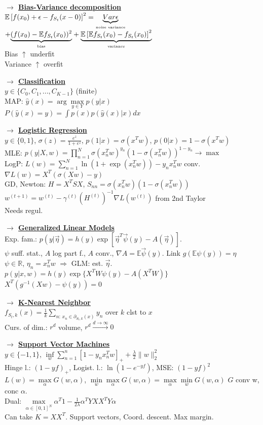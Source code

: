 \documentclass[11pt]{article}
\newcommand{\underlabel}[2]{\underset{\mbox{\tiny #2}}{\underbrace{#1}}}
\newcommand{\mytitle}[1]{ {\bf $\rightarrow$ \underline{#1}}\\}
\begin{document}
\begin{multicols*}{2}
\mytitle{Bias-Variance decomposition}
$\mathbb{E}\left[f(x_0)+\epsilon-f_{S_t}(x-0)\right]^2=\underlabel{Var\epsilon}{noise variance}$\\
$+\underlabel{(f(x_0)-\mathbb{E}f_{S_t}(x_0))^2}{bias}+\underlabel{\mathbb{E}\left[\mathbb{E}f_{S_t}(x_0)-f_{S_t}(x_0)\right]^2}{variance}$\\
Bias $\uparrow$ underfit\\
Variance $\uparrow$ overfit

\mytitle{Classification}
$y\in \{C_0,C_1,...,C_{K-1}\}$ (finite)\\
MAP: $\hat{y}(x)=\arg\max\limits_{y\in Y}p(y|x)$\\
$P(\hat{y}(x)=y)=\int p(x)p(\hat{y}(x)|x)dx$


\mytitle{Logistic Regression}
$y\in\{0,1\}$, $\sigma(z)=\frac{e^z}{1+e^z}$, $p(1|x)=\sigma(x^Tw)$, $p(0|x)=1-\sigma(x^Tw)$\\
MLE: $p(y|X,w)=\prod\limits_{n=1}^N\sigma(x_n^Tw)^{y_n}\left(1-\sigma(x_n^Tw)\right)^{1-y_n}\to\max$\\
LogP: $L(w)=\sum\limits_{n=1}^N\ln(1+\exp(x_n^Tw))-y_nx_n^Tw$ conv.\\
$\nabla L(w)=X^T(\sigma(Xw)-y)$\\
GD, Newton: $H=X^TSX$, $S_{nn}=\sigma(x_n^Tw)(1-\sigma(x_n^Tw))$\\
$w^{(t+1)}=w^{(t)}-\gamma^{(t)}(H^{(t)})^{-1}\nabla L(w^{(t)})$ from 2nd Taylor\\
Needs regul.

\mytitle{Generalized Linear Models}
Exp. fam.: $p(y|\vec{\eta})=h(y)\exp\left[\vec{\eta}^T\vec{\psi}(y)-A(\vec{\eta})\right]$.\\
$\psi$ suff. stat., $A$ log part f., 
$A$ conv., $\nabla A=\mathbb{E}\vec{\psi}(y)$. Link $g(\mathbb{E}\psi(y))=\eta$\\
$\psi\in \mathbb{R}$, $\eta_n=x_n^Tw$ $\Rightarrow$ GLM: est. $\vec{\eta}$.\\
$p(y|x,w)=h(y)\exp\{X^TW\psi(y)-A(X^TW)\}$\\
$X^T(g^{-1}(Xw)-\psi(y))=0$

\mytitle{K-Nearest Neighbor}
$f_{S_t,k}(x)=\frac{1}{k}\sum\limits_{n\colon\,x_n\in \partial_{S_t,k}(x)}y_n$ over $k$ clst to $x$\\
Curs. of dim.: $r^d$ volume, $r^d\overset{d\to\infty}\to 0$

\mytitle{Support Vector Machines}
$y\in\{-1,1\}$, $\inf\limits_w\sum\limits_{n=1}^n\left[1-y_nx_n^Tw\right]_++\frac{\lambda}{2}\|w\|^2_2$\\
Hinge l.: $(1-yf)_+$, Logist. l.: $\ln(1-e^{-yf})$, MSE: $(1-yf)^2$\\
$L(w)=\max\limits_\alpha G(w,\alpha)$, $\min\limits_w\max\limits_\alpha G(w,\alpha)=\max\limits_\alpha\min\limits_w G(w,\alpha)$
$G$ conv w, conc $\alpha$.\\
Dual: $\max\limits_{\alpha\in[0,1]^N}\alpha^T1-\frac{1}{2\lambda}\alpha^TYXX^TY\alpha$\\
Can take $K=XX^T$. Support vectors, Coord. descent. Max margin.


\end{multicols*}
\end{document}
